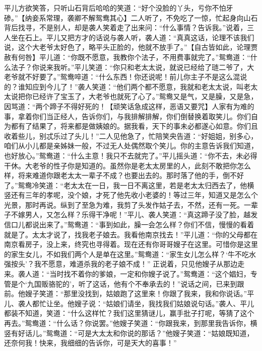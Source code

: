 \documentclass[12pt,oneside]{book}
\begin{document}
平儿方欲笑答，只听山石背后哈哈的笑道：“好个没脸的丫头，亏你不怕牙碜。”【纳妾系常理，袭卿不解鸳鸯其心】二人听了，不免吃了一惊，忙起身向山石背后找寻，不是别人，却是袭人笑着走了出来问：“什么事情？告诉我。”说着，三人坐在石上。平儿又把方才的话说与袭人听，袭人道：“真真这话，论理不该我们说，这个大老爷太好色了，略平头正脸的，他就不放手了。”【自古皆如此，论理贾赦有何咎】平儿道：“你既不愿意，我教你个法子，不用费事就完了。”鸳鸯道：“什么法子？你说来我听。”平儿笑道：“你只和老太太说，就说已经给了琏二爷了，大老爷就不好要了。”鸳鸯啐道：“什么东西！你还说呢！前儿你主子不是这么混说的？谁知应到今儿了！”袭人笑道：“他们两个都不愿意，我就和老太太说，叫老太太说把你已经许了宝玉了，大老爷也就死了心了。”鸳鸯又是气，又是臊，又是急，因骂道：“两个蹄子不得好死的！【顽笑话急成这样，恶语又要咒】人家有为难的事，拿着你们当正经人，告诉你们，与我排解排解，你们倒替换着取笑儿。你们自为都有了结果了，将来都是做姨娘的。据我看，天下的事未必都遂心如意。你们且收着些儿，别忒乐过了头儿！”二人见他急了，忙陪笑央告道：“好姐姐，别多心，咱们从小儿都是亲姊妹一般，不过无人处偶然取个笑儿。你的主意告诉我们知道，也好放心。”鸳鸯道：“什么主意！我只不去就完了。”平儿摇头道：“你不去，未必得干休。大老爷的性子你是知道的。虽然你是老太太房里的人，此刻不敢把你怎么样，将来难道你跟老太太一辈子不成？也要出去的。那时落了他的手，倒不好了。”鸳鸯冷笑道：“老太太在一日，我一日不离这里，若是老太太归西去了，他横竖还有三年的孝呢，没个娘，才死了他先收小老婆的！等过三年，知道又是怎么个光景，那时再说。纵到了至急为难，我剪了头发作姑子去，不然，还有一死。一辈子不嫁男人，又怎么样？乐得干净呢！”平儿、袭人笑道：“真这蹄子没了脸，越发信口儿都说出来了。”鸳鸯道：“事到如此，臊一会怎么样？你们不信，慢慢的看着就是了。太太才说了，找我老子娘去。我看他南京找去！”平儿道：“你的父母都在南京看房子，没上来，终究也寻得着。现在还有你哥哥嫂子在这里。可惜你是这里的家生女儿，不如我们两个人是单在这里。”鸳鸯道：“家生女儿怎么样？‘牛不吃水强按头’？我不愿意，难道杀我的老子娘不成！”
正说着，只见他嫂子从那边走来。袭人道：“当时找不着你的爹娘，一定和你嫂子说了。”鸳鸯道：“这个娼妇，专管是个‘九国贩骆驼的’，听了这话，他有个不奉承去的！”说话之间，已来到跟前。他嫂子笑道：“那里没找到，姑娘跑了这里来！你跟了我来，我和你说话。”平儿、袭人都忙让坐。他嫂子说：“姑娘们请坐，我找我们姑娘说句话。”袭人、平儿都装不知道，笑道：“什么这样忙？我们这里猜谜儿，赢手批子打呢，等猜了这个再去。”鸳鸯道：“什么话？你说罢。”他嫂子笑道：“你跟我来，到那里我告诉你，横竖有好话儿。”鸳鸯道：“可是大太太和你说的那话？”他嫂子笑道：“姑娘既知道，还奈何我！快来，我细细的告诉你，可是天大的喜事！”
\end{document}
